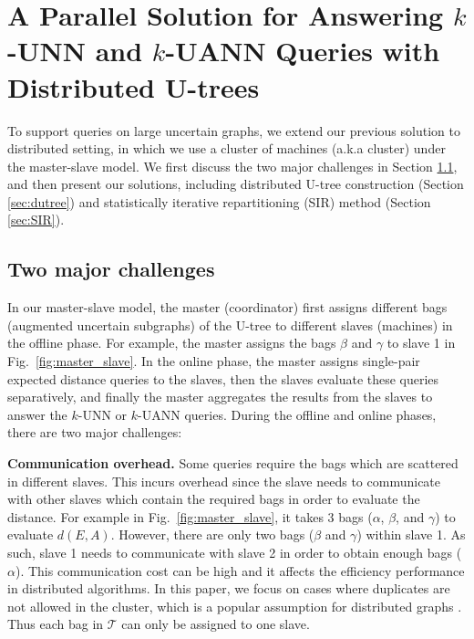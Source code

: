 \section{A Parallel Solution for Answering $k$-UNN and $k$-UANN Queries with Distributed U-trees}
\label{sec:distribute}	

To support queries on large uncertain graphs, we extend our previous solution to distributed setting, in which we use a cluster of machines (a.k.a cluster) under the master-slave model.
We first discuss the two major challenges in Section \ref{sec:master-slave}, and then present our solutions, including distributed U-tree construction (Section \ref{sec:dutree}) and statistically iterative repartitioning (SIR) method (Section \ref{sec:SIR}).

\begin{figure*}[!t]
	\centering
	\npart
	\hfil
	\hfil
	\caption{An overview of our parallel solution: (a) offline phase (b) online phase (c) overview of SIR method, illustrated by a $k$-UANN query with input $S$=$\{C,E\}$ from Fig. \ref{fig:Q1}.}
	\label{fig:master_slave}
\end{figure*}

\subsection{Two major challenges}
\label{sec:master-slave}

In our master-slave model, the master (coordinator) first assigns different bags (augmented uncertain subgraphs) of the U-tree to different slaves (machines) in the offline phase. For example, the master assigns the bags $\beta$ and $\gamma$ to slave 1 in Fig.~\ref{fig:master_slave}.
%
In the online phase, the master assigns single-pair expected distance queries to the slaves, then the slaves evaluate these queries separatively, and finally the master aggregates the results from the slaves to answer the $k$-UNN or $k$-UANN queries. 
%
During the offline and online phases, there are two major challenges:

{\bf Communication overhead. } Some queries require the bags which are scattered in different slaves. This incurs overhead since the slave needs to communicate with other slaves which contain the required bags in order to evaluate the distance. 
For example in Fig.~\ref{fig:master_slave}, it takes 3 bags ($\alpha$, $\beta$, and $\gamma$) to evaluate $d(E,A)$. However, there are only two bags ($\beta$ and $\gamma$) within slave 1. As such, slave 1 needs to communicate with slave 2 in order to obtain enough bags ($\alpha$). This communication cost can be high and it affects the efficiency performance in distributed algorithms. 
In this paper, we focus on cases where duplicates are not allowed in the cluster, which is a popular assumption for distributed graphs \cite{kassiano2016mining,cheng2016distr}. Thus each bag in $\mathcal{T}$ can only be assigned to one slave.

